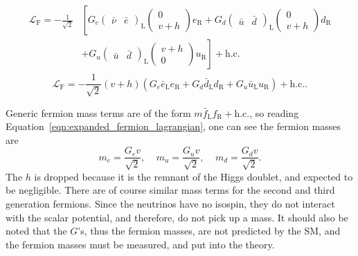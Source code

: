 \begin{align}
  \begin{split}
    \mathcal{L}_\mathrm{F} =
      - \frac{1}{\sqrt{2}}
      &
      \left[
      G_e
    \begin{pmatrix} \bar{\nu} & \bar{e} \end{pmatrix}_\mathrm{L}
    \begin{pmatrix} 0 \\ v+h \end{pmatrix}
      e_\mathrm{R}
      + G_d
    \begin{pmatrix} \bar{u} & \bar{d} \end{pmatrix}_\mathrm{L}
    \begin{pmatrix} 0 \\ v+h \end{pmatrix}
      d_\mathrm{R}
      \right.
      \\
      &
      \left.
      + G_u
    \begin{pmatrix} \bar{u} & \bar{d} \end{pmatrix}_\mathrm{L}
    \begin{pmatrix} v+h \\ 0 \end{pmatrix}
      u_\mathrm{R}
    \right]
    + \mathrm{h.c.}
  \end{split}
\end{align}
\begin{equation}
  \mathcal{L}_\mathrm{F} =
  - \frac{1}{\sqrt{2}}
  (v+h)
  \left(
    G_e \bar{e}_\mathrm{L} e_\mathrm{R} +
    G_d \bar{d}_\mathrm{L} d_\mathrm{R} +
    G_u \bar{u}_\mathrm{L} u_\mathrm{R}
  \right) + \mathrm{h.c.}.
  \label{eqn:expanded_fermion_lagrangian}
\end{equation}

Generic fermion mass terms are of the form
$m \bar{f}_\mathrm{L} f_\mathrm{R} + \mathrm{h.c.}$, so reading
Equation~\ref{eqn:expanded_fermion_lagrangian}, one can see the fermion masses
are
\begin{equation}
    m_e = \frac{G_e v}{\sqrt{2}},~~~~~
    m_u = \frac{G_u v}{\sqrt{2}},~~~~~
    m_d = \frac{G_d v}{\sqrt{2}}.
\end{equation}
The $h$ is dropped because it is the remnant of the Higgs doublet, and expected
to be negligible.
There are of course similar mass terms for the second and third generation
fermions.
Since the neutrinos have no isospin, they do not interact with the scalar
potential, and therefore, do not pick up a mass.
It should also be noted that the $G$'s, thus the fermion masses, are not
predicted by the SM, and the fermion masses must be measured, and put into
the theory.

